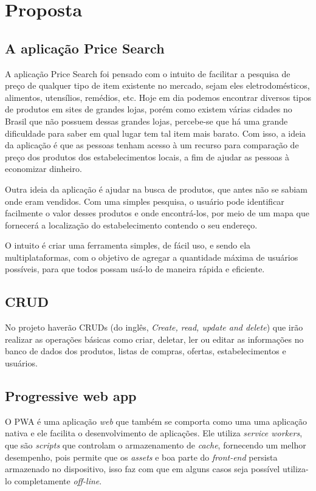 \section{Proposta}
\label{sec:proposta}

\subsection{A aplicação Price Search}

A aplicação Price Search foi pensado com o intuito de facilitar a pesquisa de preço de qualquer tipo de item existente no mercado, sejam eles eletrodomésticos, alimentos, utensílios, remédios, etc. Hoje em dia podemos encontrar diversos tipos de produtos em sites de grandes lojas, porém como existem várias cidades no Brasil que não possuem dessas grandes lojas, percebe-se que há uma grande dificuldade para saber em qual lugar tem tal item mais barato. Com isso, a ideia da aplicação é que as pessoas tenham acesso à um recurso para comparação de preço dos produtos dos estabelecimentos locais, a fim de ajudar as pessoas à economizar dinheiro. 

Outra ideia da aplicação é ajudar na busca de produtos, que antes não se sabiam onde eram vendidos. Com uma simples pesquisa, o usuário pode identificar facilmente o valor desses produtos e onde encontrá-los, por meio de um mapa que fornecerá a localização do estabelecimento contendo o seu endereço. 

O intuito é criar uma ferramenta simples, de fácil uso, e sendo ela multiplataformas, com o objetivo de agregar a quantidade máxima de usuários possíveis, para que todos possam usá-lo de maneira rápida e eficiente.

\subsection{CRUD}
No projeto haverão CRUDs (do inglês, \textit{ Create, read, update and delete}) que irão realizar as operações básicas como criar, deletar, ler ou editar as informações no banco de dados dos produtos, listas de compras, ofertas, estabelecimentos e usuários. 

\subsection{Progressive web app}

O PWA é uma aplicação \textit{web} que também se comporta como uma uma aplicação nativa e ele facilita o desenvolvimento de aplicações. Ele utiliza \textit{service workers}, que são \textit{scripts} que controlam o armazenamento de \textit{cache}, fornecendo um melhor desempenho, pois permite que os \textit{assets} e boa parte do \textit{front-end} persista armazenado no dispositivo, isso faz com que em alguns casos seja possível utiliza-lo completamente \textit{off-line}.

